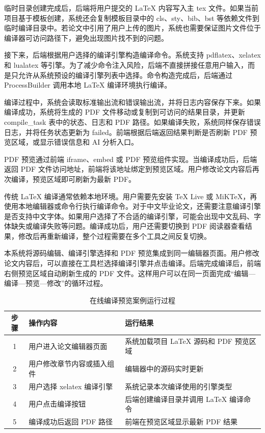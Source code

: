 \documentclass{xduugthesis}
\begin{document}
临时目录创建完成后，后端将用户提交的 LaTeX 内容写入主 tex 文件。如果当前项目基于模板创建，系统还会复制模板目录中的 cls、sty、bib、bst 等依赖文件到临时编译目录中。若论文中引用了用户上传的图片，系统也需要保证图片文件位于编译器可访问路径下，避免出现图片找不到的问题。

接下来，后端根据用户选择的编译引擎构造编译命令。系统支持 pdflatex、xelatex 和 lualatex 等引擎。为了减少命令注入风险，后端不直接拼接任意用户输入，而是只允许从系统预设的编译引擎列表中选择。命令构造完成后，后端通过 ProcessBuilder 调用本地 LaTeX 编译环境执行编译。

编译过程中，系统会读取标准输出流和错误输出流，并将日志内容保存下来。如果编译成功，系统将生成的 PDF 文件移动或复制到可访问的结果目录，并更新 compile\_task 表中的状态、日志和 PDF 路径。如果编译失败，系统同样保存错误日志，并将任务状态更新为 failed。前端根据后端返回结果判断是否刷新 PDF 预览区域，或显示错误信息和 AI 分析入口。

PDF 预览通过前端 iframe、embed 或 PDF 预览组件实现。当编译成功后，后端返回 PDF 文件访问地址，前端将该地址绑定到预览区域。用户修改论文内容后再次编译，预览区域即可刷新为最新 PDF。

传统 LaTeX 编译通常依赖本地环境。用户需要先安装 TeX Live 或 MiKTeX，再使用本地编辑器或命令行执行编译命令。对于中文毕业论文，还需要注意编译引擎是否支持中文字体。如果用户选择了不合适的编译引擎，可能会出现中文乱码、字体缺失或编译失败等问题。编译成功后，用户还需要切换到 PDF 阅读器查看结果，修改后再重新编译，整个过程需要在多个工具之间反复切换。

本系统将源码编辑、编译引擎选择和 PDF 预览集成到同一编辑器页面。用户修改论文内容后，可以直接在工具栏选择编译引擎并点击编译。后端完成编译后，前端右侧预览区域自动刷新生成的 PDF 文件。这样用户可以在同一页面完成“编辑—编译—预览—修改”的循环过程。

\begin{table}[!ht]
    \centering
    \caption{在线编译预览案例运行过程}
    \label{tab:compile-preview-case}
    \begin{tabular}{|c|p{5cm}|p{6cm}|}
        \hline
        步骤 & 操作内容 & 运行结果 \\
        \hline
        1 & 用户进入论文编辑器页面 & 系统加载项目 LaTeX 源码和 PDF 预览区域 \\
        \hline
        2 & 用户修改章节内容或插入组件 & 编辑器中的源码实时更新 \\
        \hline
        3 & 用户选择 xelatex 编译引擎 & 系统记录本次编译使用的引擎类型 \\
        \hline
        4 & 用户点击编译按钮 & 后端创建编译目录并调用 LaTeX 编译命令 \\
        \hline
        5 & 编译成功后返回 PDF 路径 & 前端在预览区域显示最新 PDF 结果 \\
        \hline
    \end{tabular}
\end{table}
\end{document}
